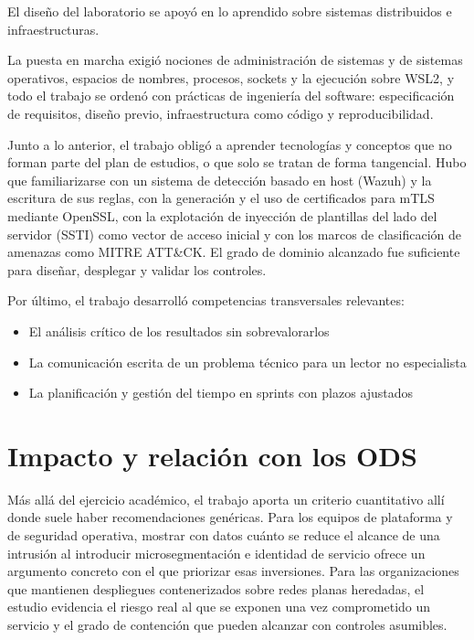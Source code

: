 \documentclass[11pt,spanish,listoffigures,listoftables]{tfgetsinf}
\begin{document}
        El diseño del laboratorio se apoyó en lo aprendido sobre sistemas distribuidos e infraestructuras.
        
        La puesta en marcha exigió nociones de administración de sistemas y de sistemas operativos, espacios de nombres, procesos, sockets y la ejecución sobre WSL2, y todo el trabajo se ordenó con prácticas de ingeniería del software: especificación de requisitos, diseño previo, infraestructura como código y reproducibilidad.
        
        Junto a lo anterior, el trabajo obligó a aprender tecnologías y conceptos que no forman parte del plan de estudios, o que solo se tratan de forma tangencial. Hubo que familiarizarse con un sistema de detección basado en host (Wazuh) y la escritura de sus reglas, con la generación y el uso de certificados para mTLS mediante OpenSSL, con la explotación de inyección de plantillas del lado del servidor (SSTI) como vector de acceso inicial y con los marcos de clasificación de amenazas como MITRE ATT\&CK. El grado de dominio alcanzado fue suficiente para diseñar, desplegar y validar los controles.
        
        Por último, el trabajo desarrolló competencias transversales relevantes: 
        \begin{itemize}
            \item El análisis crítico de los resultados sin sobrevalorarlos
            \item La comunicación escrita de un problema técnico para un lector no especialista
            \item La planificación y gestión del tiempo en sprints con plazos ajustados
        \end{itemize}

        \section{Impacto y relación con los ODS}
        Más allá del ejercicio académico, el trabajo aporta un criterio cuantitativo allí donde suele haber recomendaciones genéricas. Para los equipos de plataforma y de seguridad operativa, mostrar con datos cuánto se reduce el alcance de una intrusión al introducir microsegmentación e identidad de servicio ofrece un argumento concreto con el que priorizar esas inversiones. Para las organizaciones que mantienen despliegues contenerizados sobre redes planas heredadas, el estudio evidencia el riesgo real al que se exponen una vez comprometido un servicio y el grado de contención que pueden alcanzar con controles asumibles.
\end{document}
